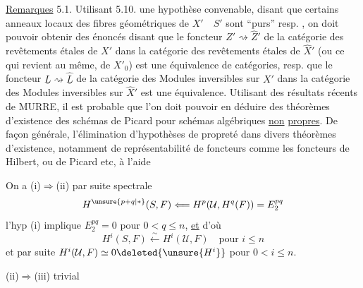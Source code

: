 \uline{Remarques} 5.1. Utilisant 5.10.
une hypothèse convenable, disant que certains anneaux locaux des fibres
géométriques de $X'\quad S'$ sont ``purs'' resp. , on doit pouvoir
obtenir des énoncés disant  que le foncteur $Z'\rightsquigarrow\widehat Z'$ de la catégorie
des revêtements étales de $X'$ dans la catégorie des revêtements étales de
$\widehat X'$  (ou ce qui revient au même, de $X'_0$) est  une
équivalence de catégories, resp. que le foncteur $\underline L\rightsquigarrow\widehat{\underline L}$ de la catégorie
des Modules inversibles sur $X'$ dans la catégorie des Modules inversibles
sur $\widehat X'$ est une équivalence. Utilisant des résultats récents de MURRE,
il est probable que l'on doit pouvoir en déduire des théorèmes d'existence
 des schémas de Picard pour  schémas algébriques  \uline{non}
\uline{propres}.  De façon générale, l'élimination d'hypothèses de propreté
dans divers théorèmes d'existence, notamment de représentabilité de
foncteurs comme les foncteurs de Hilbert, ou de Picard etc, à l'aide

On a (i)$\Rightarrow$(ii) par suite spectrale
\[
H^{\unsure{p+q|\ast}}(S,F)\Longleftarrow H^p(\mathcal U,H^q(F))=E_2^{pq}
\]
l'hyp (i) implique $E_2^{pq}=0$ pour $0<q\leq n$, \uline{et}
d'où
\[
H^i(S,F)\xleftarrow{\sim}H^i(\mathcal U,F)\quad\text{pour }i\leq n
\]
et par suite $H^i(\mathcal U,F)\simeq0\deleted{\unsure{H^i}}$ pour $0<i\leq n$.

(ii)$\Rightarrow$(iii) trivial


